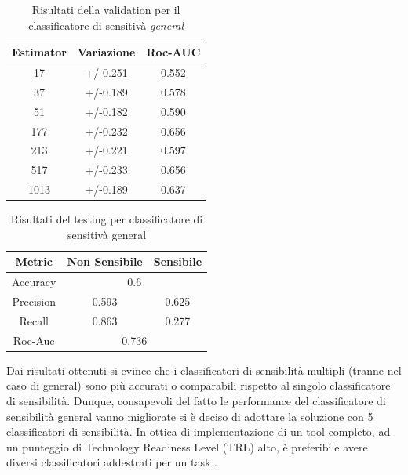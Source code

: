 \begin{table}[h]

\centering
\begin{tabular}{|c|c|c|}
\hline
\textbf{Estimator} & \textbf{Variazione} & \textbf{Roc-AUC} \\ \hline
17 & +/-0.251 & 0.552 \\ \hline
37 & +/-0.189 & 0.578 \\ \hline
51 & +/-0.182 & 0.590 \\ \hline
177 & +/-0.232 & 0.656 \\ \hline
213 & +/-0.221 & 0.597 \\ \hline
517 & +/-0.233 & 0.656 \\ \hline
1013 & +/-0.189 & 0.637 \\ \hline
\end{tabular}
\caption{Risultati della validation per il classificatore di sensitivà \textit{general}}
\label{tbl:val_sens_general}
\end{table}
\FloatBarrier

\begin{table}[h]

\centering
\begin{tabular}{|c|c|c|}
\hline
\textbf{Metric} & \textbf{Non Sensibile} & \textbf{Sensibile} \\ \hline
Accuracy & \multicolumn{2}{c|}{0.6} \\ \hline
Precision & 0.593 & 0.625 \\ \hline
Recall & 0.863 & 0.277 \\ \hline
Roc-Auc & \multicolumn{2}{c|}{0.736} \\ \hline
\end{tabular}
\caption{Risultati del testing per classificatore di sensitivà general}
\label{tbl:training_sens_general}
\end{table}
\FloatBarrier


Dai risultati ottenuti si evince che i classificatori di sensibilità multipli (tranne nel caso di general) sono più accurati o comparabili rispetto al singolo classificatore di sensibilità. Dunque, consapevoli del fatto le performance del classificatore di sensibilità general vanno migliorate si è deciso di adottare la soluzione con 5 classificatori di sensibilità. In ottica di implementazione di un tool completo, ad un punteggio di Technology Readiness Level (TRL) alto, è preferibile avere diversi classificatori addestrati per un task .

